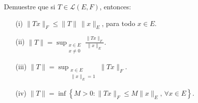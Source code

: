 Demuestre que si $T \in \mathcal{L}(E, F)$, entonces:

\begin{enumerate}
    \item[(i)] $\|T x\|_F \leq \|T\| \, \|x\|_E$, para todo $x \in E$.
    
    \item[(ii)] $
    \|T\| = \displaystyle\sup_{\substack{x \in E \\ x \neq 0}} \frac{\|T x\|_F}{\|x\|_E}.$
    
    
    \item[(iii)] 
    $
    \|T\| = \displaystyle\sup_{\substack{x\in E \\\|x\|_E = 1}} \|T x\|_F.
    $
    
    \item[(iv)] 
    $
    \|T\| = \inf \left\{ M > 0 : \|T x\|_F \leq M \|x\|_E, \, \forall x \in E \right\}.
    $
\end{enumerate}
